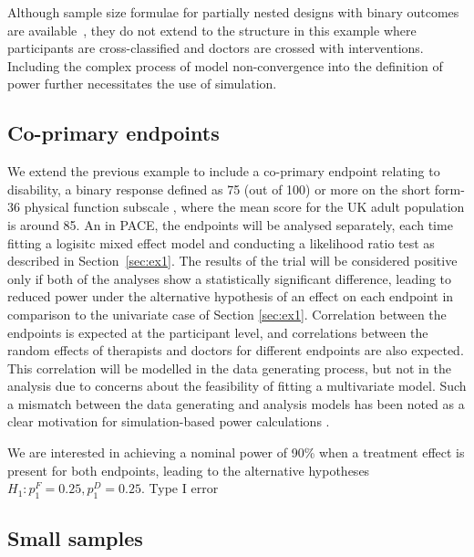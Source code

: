 \documentclass[]{sagej}
\begin{document}
Although sample size formulae for partially nested designs with binary outcomes are available~\cite{Roberts2015}, they do not extend to the structure in this example where participants are cross-classified and doctors are crossed with interventions. Including the complex process of model non-convergence into the definition of power further necessitates the use of simulation.


\subsection{Co-primary endpoints}\label{sec:ex2}

We extend the previous example to include a co-primary endpoint relating to disability, a binary response defined as 75 (out of 100) or more on the short form-36 physical function subscale \cite{McHorney1993}, where the mean score for the UK adult population is around 85. An in PACE, the endpoints will be analysed separately, each time fitting a logisitc mixed effect model and conducting a likelihood ratio test as described in Section~\ref{sec:ex1}. The results of the trial will be considered positive only if both of the analyses show a statistically significant difference, leading to reduced power under the alternative hypothesis of an effect on each endpoint in comparison to the univariate case of Section \ref{sec:ex1}\cite{Senn2007}. Correlation between the endpoints is expected at the participant level, and correlations between the random effects of therapists and doctors for different endpoints are also expected. This correlation will be modelled in the data generating process, but not in the analysis due to concerns about the feasibility of fitting a multivariate model. Such a mismatch between the data generating and analysis models has been noted as a clear motivation for simulation-based power calculations \cite{Landau2013}.

We are interested in achieving a nominal power of 90\% when a treatment effect is present for both endpoints, leading to the alternative hypotheses $H_1: p_1^F=0.25, p_1^D=0.25$. Type I error

\subsection{Small samples}\label{sec:ex3}
\end{document}
